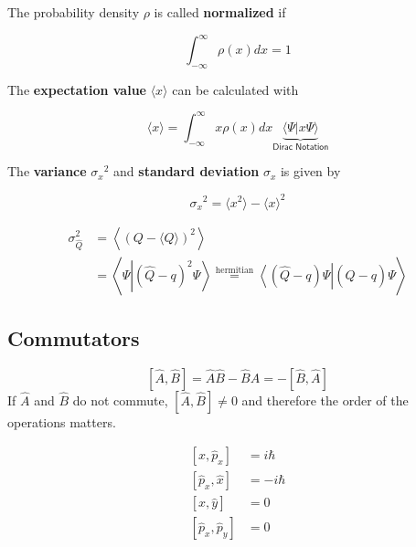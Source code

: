 The probability density $\rho$ is called \textbf{normalized} if

\begin{equation*}
    \int_{-\infty}^{\infty}\rho(x)dx = 1
\end{equation*}

The \textbf{expectation value} $\langle x \rangle$ can be calculated with

\begin{equation*}
    \langle x \rangle = \int_{-\infty}^{\infty} x\rho(x) dx \underbrace{{\langle \Psi|x\Psi\rangle} }_{\textsf{Dirac Notation}}
\end{equation*}

The \textbf{variance} ${\sigma_x}^2$ and \textbf{standard deviation} $\sigma_x$ is given by

\begin{equation*}
    {\sigma_x}^2 = \langle x^2 \rangle - {\langle x \rangle }^2
\end{equation*}

\begin{align*}
    \sigma_{\widehat{Q}}^{2} & =\left\langle{\left(Q-\langle Q\rangle\right)}^{2}\right\rangle                                                                                                                                    \\
                             & =\left\langle\Psi\left|{\left(\widehat{Q}-q\right)}^{2}\Psi\right\rangle\stackrel{\text{hermitian}}{=}\left\langle\left(\widehat{Q}-q\right)\Psi\right|\left(\widehat{Q}-q\right)\Psi\right\rangle
\end{align*}

\subsection{Commutators}\label{comm}

\noindent\begin{equation*}
    \left[\widehat{A},\widehat{B}\right] = \widehat{A}\widehat{B} - \widehat{B}\widehat{A} = -\left[\widehat{B},\widehat{A}\right]
\end{equation*}
If $\widehat{A}$ and $\widehat{B}$ do not commute, $\left[\widehat{A},\widehat{B}\right] \neq 0$ and therefore the order of the operations matters.

\newpar{}


\noindent\begin{align*}
    \left[\widehat{x},\widehat{p}_x\right]    & = i\hbar  \\
    \left[\widehat{p}_x, \widehat{x}\right]   & = -i\hbar \\
    \left[\widehat{x}, \widehat{y}\right]     & = 0       \\
    \left[\widehat{p}_x, \widehat{p}_y\right] & = 0
\end{align*}

